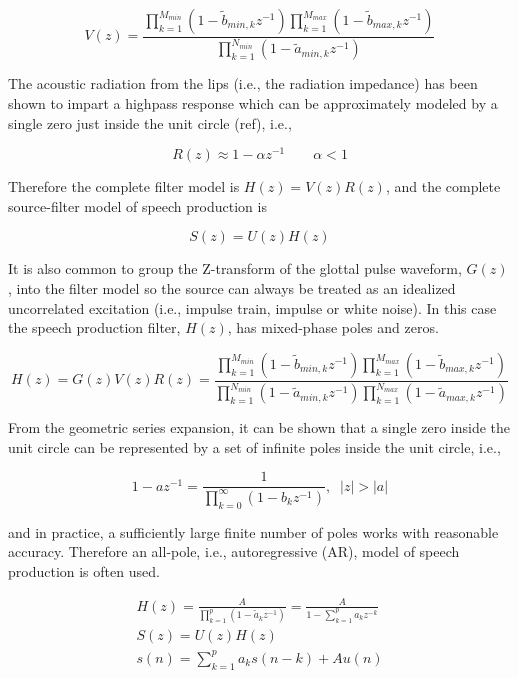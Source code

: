 \[V(z)=
\frac
{\prod_{k=1}^{M_{min}}(1-\tilde{b}_{min,k}z^{-1})
 \prod_{k=1}^{M_{max}}(1-\tilde{b}_{max,k}z^{-1})}
{\prod_{k=1}^{N_{min}}(1-\tilde{a}_{min,k} z^{-1})}
\]

The acoustic radiation from the lips (i.e., the radiation impedance) has been shown to impart a highpass response which can be approximately modeled by a single zero just inside the unit circle (ref), i.e.,

\[R(z)\approx 1-\alpha z^{-1} \qquad \alpha <1\]

Therefore the complete filter model is $H(z)=V(z)R(z)$, and the complete source-filter model of speech production is

\[S(z)=U(z)H(z)\]

It is also common to group the Z-transform of the glottal pulse waveform, $G(z)$, into the filter model so the source can always be treated as an idealized uncorrelated excitation (i.e., impulse train, impulse or white noise). In this case the speech production filter, $H(z)$, has mixed-phase poles and zeros.

\begin{equation}
	H(z) = G(z)V(z)R(z) = 
	\frac
	{\prod_{k=1}^{M_{min}}(1-\tilde{b}_{min,k}z^{-1})
	 \prod_{k=1}^{M_{max}}(1-\tilde{b}_{max,k}z^{-1})}
	{\prod_{k=1}^{N_{min}}(1-\tilde{a}_{min,k} z^{-1})
	 \prod_{k=1}^{N_{max}}(1-\tilde{a}_{max,k} z^{-1})}
\end{equation}

From the geometric series expansion, it can be shown that a single zero inside the unit circle can be represented by a set of infinite poles inside the unit circle, i.e.,

\begin{equation}
	1-az^{-1} = \frac{1}{\prod_{k=0}^{\infty}(1-b_k z^{-1})}, \;\; |z| > |a| \label{eq:zero_approx}
\end{equation}

\noindent
and in practice, a sufficiently large finite number of poles works with reasonable accuracy. Therefore an all-pole, i.e., autoregressive (AR), model of speech production is often used.

\begin{eqnarray}
	H(z) = \frac{A}{\prod_{k=1}^{p}(1-\tilde{a}_k z^{-1})} = \frac{A}{1 - \sum_{k=1}^{p} a_k z^{-k}}\\
	S(z)=U(z)H(z) \\
	s(n) = \sum_{k=1}^{p}a_k s(n-k) + Au(n) \label{eq:AR_speech}
\end{eqnarray}

